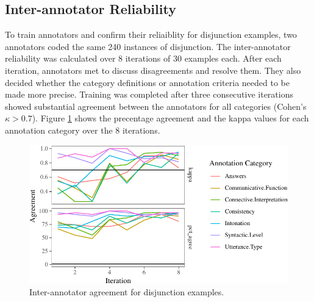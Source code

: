\documentclass[oneside]{report}
\theoremstyle{definition}
\theoremstyle{definition}
\theoremstyle{definition}
\theoremstyle{remark}
\begin{document}
\subsection{Inter-annotator
Reliability}\label{inter-annotator-reliability}

To train annotators and confirm their reliaiblity for disjunction
examples, two annotators coded the same 240 instances of disjunction.
The inter-annotator reliability was calculated over 8 iterations of 30
examples each. After each iteration, annotators met to discuss
disagreements and resolve them. They also decided whether the category
definitions or annotation criteria needed to be made more precise.
Training was completed after three consecutive iterations showed
substantial agreement between the annotators for all categories (Cohen's
\(\kappa > 0.7\)). Figure \ref{fig:oReliabilityPlot} shows the
precentage agreement and the kappa values for each annotation category
over the 8 iterations.
\begin{figure}[tb]

{\centering \includegraphics{figs/oReliabilityPlot-1} 

}

\caption{Inter-annotator agreement for disjunction examples.}\label{fig:oReliabilityPlot}
\end{figure}
\newline
\end{document}
